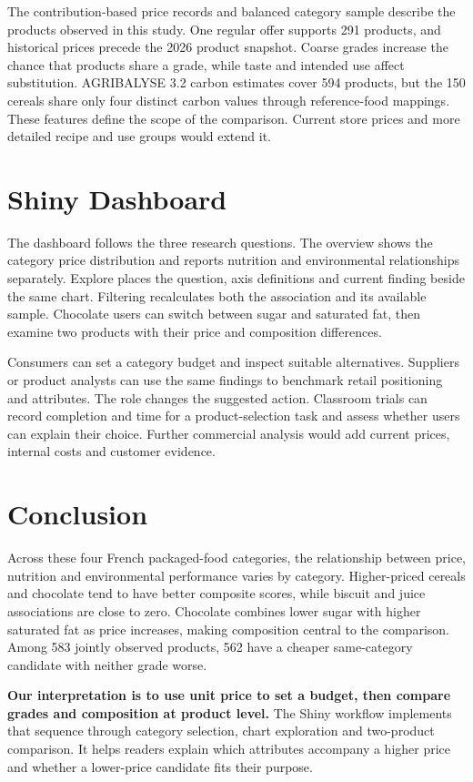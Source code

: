 \documentclass[11pt,a4paper,onecolumn,oneside]{tau-class/tau}
\begin{document}
The contribution-based price records and balanced category sample describe the products observed in this study. One regular offer supports 291 products, and historical prices precede the 2026 product snapshot. Coarse grades increase the chance that products share a grade, while taste and intended use affect substitution. AGRIBALYSE 3.2 carbon estimates cover 594 products, but the 150 cereals share only four distinct carbon values through reference-food mappings. These features define the scope of the comparison. Current store prices and more detailed recipe and use groups would extend it.

\section{Shiny Dashboard}
The dashboard follows the three research questions. The overview shows the category price distribution and reports nutrition and environmental relationships separately. Explore places the question, axis definitions and current finding beside the same chart. Filtering recalculates both the association and its available sample. Chocolate users can switch between sugar and saturated fat, then examine two products with their price and composition differences.

Consumers can set a category budget and inspect suitable alternatives. Suppliers or product analysts can use the same findings to benchmark retail positioning and attributes. The role changes the suggested action. Classroom trials can record completion and time for a product-selection task and assess whether users can explain their choice. Further commercial analysis would add current prices, internal costs and customer evidence.

\section{Conclusion}
Across these four French packaged-food categories, the relationship between price, nutrition and environmental performance varies by category. Higher-priced cereals and chocolate tend to have better composite scores, while biscuit and juice associations are close to zero. Chocolate combines lower sugar with higher saturated fat as price increases, making composition central to the comparison. Among 583 jointly observed products, 562 have a cheaper same-category candidate with neither grade worse.

\textbf{Our interpretation is to use unit price to set a budget, then compare grades and composition at product level.} The Shiny workflow implements that sequence through category selection, chart exploration and two-product comparison. It helps readers explain which attributes accompany a higher price and whether a lower-price candidate fits their purpose.
\end{document}
